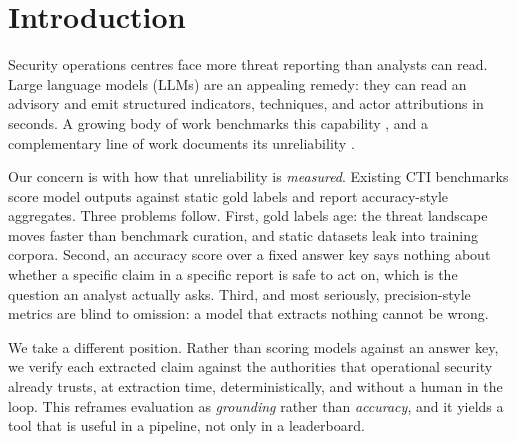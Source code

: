\documentclass[10pt,twocolumn]{article}
\begin{document}
\section{Introduction}

Security operations centres face more threat reporting than analysts can read.
Large language models (LLMs) are an appealing remedy: they can read an advisory
and emit structured indicators, techniques, and actor attributions in seconds.
A growing body of work benchmarks this capability
\cite{alam2024ctibench,alam2025athenabench,cyberthreateval2026}, and a
complementary line of work documents its unreliability
\cite{mezzi2025unreliable,uncovering2025vulnerabilities}.

Our concern is with how that unreliability is \emph{measured}. Existing CTI
benchmarks score model outputs against static gold labels and report
accuracy-style aggregates. Three problems follow. First, gold labels age: the
threat landscape moves faster than benchmark curation, and static datasets
leak into training corpora. Second, an accuracy score over a fixed answer key
says nothing about whether a specific claim in a specific report is safe to act
on, which is the question an analyst actually asks. Third, and most seriously,
precision-style metrics are blind to omission: a model that extracts nothing
cannot be wrong.

We take a different position. Rather than scoring models against an answer key,
we verify each extracted claim against the authorities that operational
security already trusts, at extraction time, deterministically, and without a
human in the loop. This reframes evaluation as \emph{grounding} rather than
\emph{accuracy}, and it yields a tool that is useful in a pipeline, not only in
a leaderboard.
\end{document}

